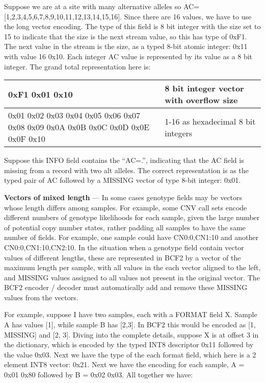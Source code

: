 \documentclass[8pt]{article}
\begin{document}
Suppose we are at a site with many alternative alleles so AC=[1,2,3,4,5,6,7,8,9,10,11,12,13,14,15,16].  Since there are 16 values, we have to use the long vector encoding.  The type of this field is 8 bit integer with the size set to 15 to indicate that the size is the next stream value, so this has type of 0xF1.  The next value in the stream is the size, as a typed 8-bit atomic integer: 0x11 with value 16 0x10.  Each integer AC value is represented by its value as a 8 bit integer.  The grand total representation here is:

\vspace{0.3cm}
\begin{tabular}{|p{9cm} | p{6cm}|} \hline
0xF1 0x01 0x10 & 8 bit integer vector with overflow size \\ \hline
0x01 0x02 0x03 0x04 0x05 0x06 0x07 0x08 0x09 0x0A 0x0B 0x0C 0x0D 0x0E 0x0F 0x10 & 1-16 as hexadecimal 8 bit integers \\ \hline
\end{tabular}
\vspace{0.3cm}

Suppose this INFO field contains the ``AC=.'', indicating that the AC field is missing from a record with two alt alleles.  The correct representation is as the typed pair of AC followed by a MISSING vector of type 8-bit integer: 0x01.

\vspace{0.3cm}
\textbf{Vectors of mixed length} --- In some cases genotype fields may be vectors whose length differs among samples.  For example, some CNV call sets encode different numbers of genotype likelihoods for each sample, given the large number of potential copy number states, rather padding all samples to have the same number of fields.  For example, one sample could have CN0:0,CN1:10 and another CN0:0,CN1:10,CN2:10.  In the situation when a genotype field contain vector values of different lengths, these are represented in BCF2 by a vector of the maximum length per sample, with all values in the each vector aligned to the left, and MISSING values assigned to all values not present in the original vector.  The BCF2 encoder / decoder must automatically add and remove these MISSING values from the vectors.

For example, suppose I have two samples, each with a FORMAT field X.  Sample A has values [1], while sample B has [2,3].  In BCF2 this would be encoded as [1, MISSING] and [2, 3].  Diving into the complete details, suppose X is at offset 3 in the dictionary, which is encoded by the typed INT8 descriptor 0x11 followed by the value 0x03.  Next we have the type of the each format field, which here is a 2 element INT8 vector: 0x21.  Next we have the encoding for each sample, A = 0x01 0x80 followed by B = 0x02 0x03.  All together we have:
\end{document}
